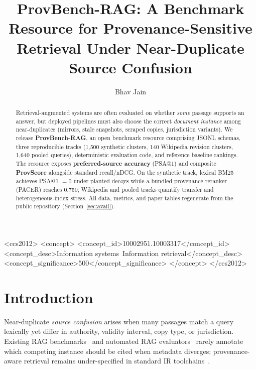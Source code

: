\documentclass[sigconf]{acmart}
\author{Bhav Jain}
\affiliation{%
  \institution{American Heritage Palm Beach}
  \city{Boca Raton}
  \country{USA}
}
\title{ProvBench-RAG: A Benchmark Resource for Provenance-Sensitive Retrieval Under Near-Duplicate Source Confusion}
\newcommand{\ProvBenchNumQueries}{1,500}
\newcommand{\WikiNumQueries}{140}
\newcommand{\CombinedNumQueries}{1,640}
\newcommand{\ProvPacerPSA}{0.750}
\begin{document}
\begin{abstract}
Retrieval-augmented systems are often evaluated on whether \emph{some} passage supports an answer, but deployed pipelines must also choose the correct \emph{document instance} among near-duplicates (mirrors, stale snapshots, scraped copies, jurisdiction variants).
We release \textbf{ProvBench-RAG}, an open benchmark resource comprising JSONL schemas, three reproducible tracks (\ProvBenchNumQueries{} synthetic clusters, \WikiNumQueries{} Wikipedia revision clusters, \CombinedNumQueries{} pooled queries), deterministic evaluation code, and reference baseline rankings.
The resource exposes \textbf{preferred-source accuracy} (PSA@1) and composite \textbf{ProvScore} alongside standard recall/nDCG.
On the synthetic track, lexical BM25 achieves PSA@1 $=0$ under planted decoys while a bundled provenance reranker (PACER) reaches \ProvPacerPSA{}; Wikipedia and pooled tracks quantify transfer and heterogeneous-index stress.
All data, metrics, and paper tables regenerate from the public repository (Section~\ref{sec:avail}).
\end{abstract}

\begin{CCSXML}
<ccs2012>
   <concept>
       <concept_id>10002951.10003317</concept_id>
       <concept_desc>Information systems~Information retrieval</concept_desc>
       <concept_significance>500</concept_significance>
   </concept>
</ccs2012>
\end{CCSXML}



\maketitle

\section{Introduction}
Near-duplicate \emph{source confusion} arises when many passages match a query lexically yet differ in authority, validity interval, copy type, or jurisdiction.
Existing RAG benchmarks~\cite{lewis2020retrieval,jacovi2025facts,krishna2024frames,huwiler2025versionrag,thakur2021beir} and automated RAG evaluators~\cite{es2023ragas,gao2024rag_survey} rarely annotate which competing instance should be cited when metadata diverges; provenance-aware retrieval remains under-specified in standard IR toolchains~\cite{saad2022provenance,robertson2009bm25,lin2021pyserini}.
\end{document}
